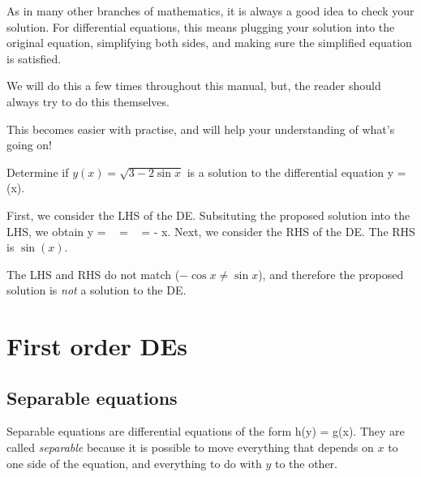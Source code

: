 \documentclass{book}
\begin{document}
As in many other branches of mathematics, it is always a good idea to
check your solution.  For differential equations, this means plugging
your solution into the original equation, simplifying both sides, and
making sure the simplified equation is satisfied.

We will do this a few times throughout this manual, but, the reader
should always try to do this themselves.

This becomes easier with practise, and will help your understanding of
what's going on!

\begin{example}
  Determine if $y(x) = \sqrt{3-2\sin x}$ is a solution to the
  differential equation
  \be
    y  = \sin(x).
  \ee
\end{example}

\begin{solution}
  First, we consider the LHS of the DE.  Subsituting the proposed
  solution into the LHS, we obtain
  \be
    y  = \   
                = \  
                = - \cos x.
  \ee
  Next, we consider the RHS of the DE.  The RHS is $\sin(x)$.

  The LHS and RHS do not match ($-\cos x \neq \sin x$), and therefore
  the proposed solution is \emph{not} a solution to the DE.
\end{solution}


\newpage
\chapter{First order DEs}



\newpage
\section{Separable equations}

Separable equations are differential equations of the form
\bel
  \label{eq:separable}
  h(y)  = g(x).
\eel
They are called \emph{separable} because it is possible to move
everything that depends on $x$ to one side of the equation, and
everything to do with $y$ to the other.
\end{document}
